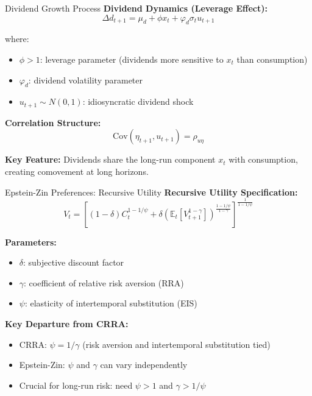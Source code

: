 \documentclass{beamer}
\newcommand{\E}{\mathbb{E}}
\newcommand{\Cov}{\mathrm{Cov}}
\begin{document}
\begin{frame}{Dividend Growth Process}
    \textbf{Dividend Dynamics (Leverage Effect):}
    \begin{equation}
        \Delta d_{t+1} = \mu_d + \phi x_t + \varphi_d \sigma_t u_{t+1}
    \end{equation}
    
    where:
    \begin{itemize}
        \item $\phi > 1$: leverage parameter (dividends more sensitive to $x_t$ than consumption)
        \item $\varphi_d$: dividend volatility parameter
        \item $u_{t+1} \sim N(0,1)$: idiosyncratic dividend shock
    \end{itemize}
    
    \vspace{0.3cm}
    \textbf{Correlation Structure:}
    \begin{equation}
        \Cov(\eta_{t+1}, u_{t+1}) = \rho_{u\eta}
    \end{equation}
    
    \textbf{Key Feature:} Dividends share the long-run component $x_t$ with consumption, creating comovement at long horizons.
\end{frame}

\begin{frame}{Epstein-Zin Preferences: Recursive Utility}
    \textbf{Recursive Utility Specification:}
    \begin{equation}
        V_t = \left[ (1-\delta) C_t^{1-1/\psi} + \delta \left( \E_t\left[ V_{t+1}^{1-\gamma} \right] \right)^{\frac{1-1/\psi}{1-\gamma}} \right]^{\frac{1}{1-1/\psi}}
    \end{equation}
    
    \textbf{Parameters:}
    \begin{itemize}
        \item $\delta$: subjective discount factor
        \item $\gamma$: coefficient of relative risk aversion (RRA)
        \item $\psi$: elasticity of intertemporal substitution (EIS)
    \end{itemize}
    
    \vspace{0.3cm}
    \textbf{Key Departure from CRRA:}
    \begin{itemize}
        \item CRRA: $\psi = 1/\gamma$ (risk aversion and intertemporal substitution tied)
        \item Epstein-Zin: $\psi$ and $\gamma$ can vary independently
        \item Crucial for long-run risk: need $\psi > 1$ and $\gamma > 1/\psi$
    \end{itemize}
\end{frame}
\end{document}
